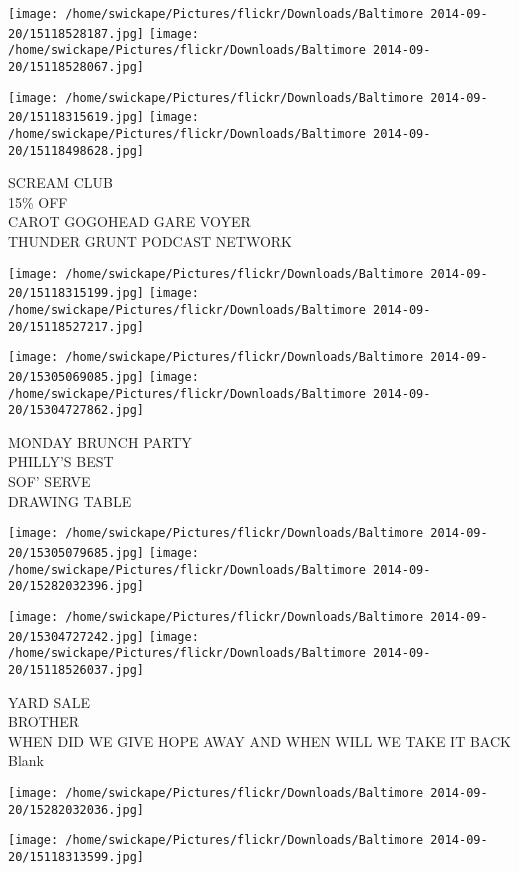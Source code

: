 \documentclass[10pt,letterpaper]{article}
\begin{document}
\texttt{[image: /home/swickape/Pictures/flickr/Downloads/Baltimore 2014-09-20/15118528187.jpg]}
\texttt{[image: /home/swickape/Pictures/flickr/Downloads/Baltimore 2014-09-20/15118528067.jpg]}

\texttt{[image: /home/swickape/Pictures/flickr/Downloads/Baltimore 2014-09-20/15118315619.jpg]}
\texttt{[image: /home/swickape/Pictures/flickr/Downloads/Baltimore 2014-09-20/15118498628.jpg]}

SCREAM CLUB\\
15\% OFF\\
CAROT GOGOHEAD GARE VOYER\\
THUNDER GRUNT PODCAST NETWORK
\pagebreak

\texttt{[image: /home/swickape/Pictures/flickr/Downloads/Baltimore 2014-09-20/15118315199.jpg]}
\texttt{[image: /home/swickape/Pictures/flickr/Downloads/Baltimore 2014-09-20/15118527217.jpg]}

\texttt{[image: /home/swickape/Pictures/flickr/Downloads/Baltimore 2014-09-20/15305069085.jpg]}
\texttt{[image: /home/swickape/Pictures/flickr/Downloads/Baltimore 2014-09-20/15304727862.jpg]}

MONDAY BRUNCH PARTY\\
PHILLY'S BEST\\
SOF' SERVE\\
DRAWING TABLE
\pagebreak

\texttt{[image: /home/swickape/Pictures/flickr/Downloads/Baltimore 2014-09-20/15305079685.jpg]}
\texttt{[image: /home/swickape/Pictures/flickr/Downloads/Baltimore 2014-09-20/15282032396.jpg]}

\texttt{[image: /home/swickape/Pictures/flickr/Downloads/Baltimore 2014-09-20/15304727242.jpg]}
\texttt{[image: /home/swickape/Pictures/flickr/Downloads/Baltimore 2014-09-20/15118526037.jpg]}

YARD SALE\\
BROTHER\\
WHEN DID WE GIVE HOPE AWAY AND WHEN WILL WE TAKE IT BACK\\
Blank
\pagebreak

\texttt{[image: /home/swickape/Pictures/flickr/Downloads/Baltimore 2014-09-20/15282032036.jpg]}

\vspace{0.25in}
\texttt{[image: /home/swickape/Pictures/flickr/Downloads/Baltimore 2014-09-20/15118313599.jpg]}
\end{document}
